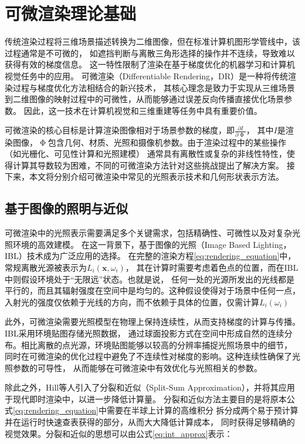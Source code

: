 \section{可微渲染理论基础}
传统渲染过程将三维场景描述转换为二维图像，但在标准计算机图形学管线中，该过程通常是不可微的，
如遮挡判断与离散三角形选择的操作并不连续，导致难以获得有效的梯度信息。
这一特性限制了渲染在基于梯度优化的机器学习和计算机视觉任务中的应用。
可微渲染（Differentiable Rendering，DR）是一种将传统渲染过程与梯度优化方法相结合的新兴技术，
其核心理念是致力于实现从三维场景到二维图像的映射过程中的可微性，从而能够通过误差反向传播直接优化场景参数。
因此，这一技术在计算机视觉和三维重建等任务中具有重要价值。

可微渲染的核心目标是计算渲染图像相对于场景参数的梯度，即$\tfrac{\partial I}{\partial \upPhi}$，
其中$I$是渲染图像，$\upPhi$包含几何、材质、光照和摄像机参数。由于渲染过程中的某些操作（如光栅化、可见性计算和光照建模）
通常具有离散性或复杂的非线性特性，使得计算其导数较为困难，不同的可微渲染方法针对这些挑战提出了解决方案。
接下来，本文将分别介绍可微渲染中常见的光照表示技术和几何形状表示方法。

\subsection{基于图像的照明与近似}
可微渲染中的光照表示需要满足多个关键需求，包括精确性、可微性以及对复杂光照环境的高效建模。
在这一背景下，基于图像的光照（Image Based Lighting，IBL）技术成为广泛应用的选择。
在完整的渲染方程\eqref{eq:rendering_equation}中，常规离散光源被表示为$L_i(\mathbf{x},\omega_i)$，
其在计算时需要考虑着色点的位置，而在IBL中则假设环境处于“无限远”状态。也就是说，
任何一处的光源所发出的光线都是平行的，而且其辐射强度在空间中是均匀的。这种假设使得对于场景中任何一点，
入射光的强度仅依赖于光线的方向，而不依赖于具体的位置，仅需计算$L_i(\omega_i)$

此外，可微渲染需要光照模型在物理上保持连续性，从而支持梯度的计算与传播。IBL采用环境贴图存储光照数据，
通过球面投影方式在空间中形成自然的连续分布。相比离散的点光源，环境贴图能够以较高的分辨率捕捉光照场景中的细节，
同时在可微渲染的优化过程中避免了不连续性对梯度的影响。这种连续性确保了光照参数的可导性，
从而能够在可微渲染中有效优化与光照相关的参数。

除此之外，Hill等人\cite{Hill_2014}引入了分裂和近似（Split-Sum Approximation），并将其应用于现代即时渲染中，以进一步降低计算量。
分裂和近似方法主要目的是将原本公式\eqref{eq:rendering_equation}中需要在半球上计算的高维积分
拆分成两个易于预计算并在运行时快速查表获得的部分，从而大大降低计算成本，
同时获得足够精确的视觉效果。分裂和近似的思想可以由公式\eqref{eq:int_approx}表示：

